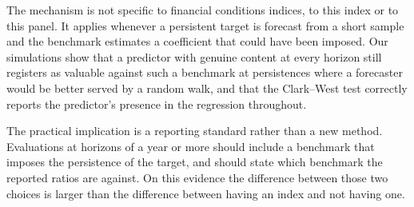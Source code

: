 \documentclass[12pt]{article}
\begin{document}
The mechanism is not specific to financial conditions indices, to this index or
to this panel. It applies whenever a persistent target is forecast from a short
sample and the benchmark estimates a coefficient that could have been imposed.
Our simulations show that a predictor with genuine content at every horizon
still registers as valuable against such a benchmark at persistences where a
forecaster would be better served by a random walk, and that the Clark--West
test correctly reports the predictor's presence in the regression throughout.

The practical implication is a reporting standard rather than a new method.
Evaluations at horizons of a year or more should include a benchmark that
imposes the persistence of the target, and should state which benchmark the
reported ratios are against. On this evidence the difference between those two
choices is larger than the difference between having an index and not having
one.
\end{document}
